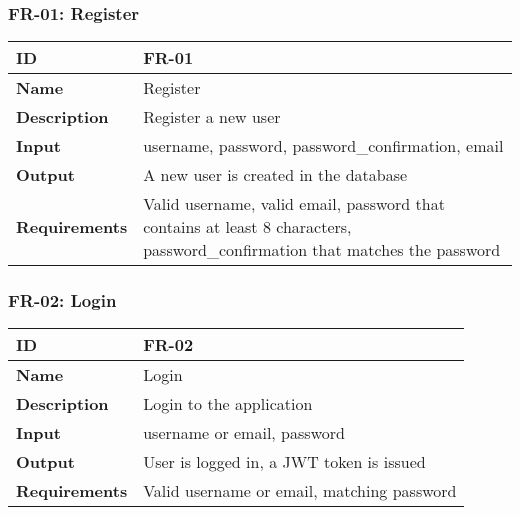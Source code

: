\newcommand{\splitcell}[2][c]{%
  \begin{tabular}[#1]{@{}c@{}}#2\end{tabular}}
\subsubsection{FR-01: Register}
\begin{center}
  \begin{tabularx}{\textwidth}{|l|X|}
      \hline
      \textbf{ID} & FR-01 \\
      \hline
      \textbf{Name} & Register \\
      \hline
      \textbf{Description} & Register a new user \\
      \hline
      \textbf{Input} & username, password, password\_confirmation, email \\
      \hline
      \textbf{Output} & A new user is created in the database \\
      \hline
      \textbf{Requirements} & Valid username, valid email, password that contains at least 8 characters, password\_confirmation that matches the password \\
      \hline
  \end{tabularx}
\end{center}

\subsubsection{FR-02: Login}
\begin{center}
  \begin{tabularx}{\textwidth}{|l|X|}
      \hline
      \textbf{ID} & FR-02 \\
      \hline
      \textbf{Name} & Login \\
      \hline
      \textbf{Description} & Login to the application \\
      \hline
      \textbf{Input} & username or email, password \\
      \hline
      \textbf{Output} & User is logged in, a JWT token is issued \\
      \hline
      \textbf{Requirements} & Valid username or email, matching password \\
      \hline
  \end{tabularx}
\end{center}


